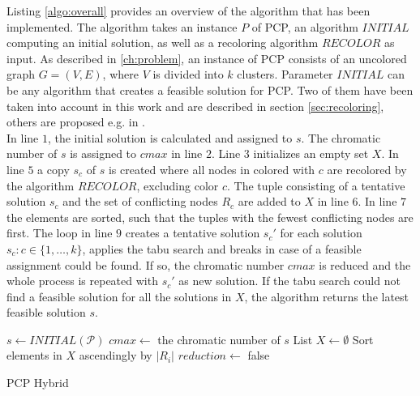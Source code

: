 Listing \ref{algo:overall} provides an overview of the algorithm that has been implemented. The algorithm takes an instance $P$ of PCP, an algorithm $\mathit{INITIAL}$ computing an initial solution, as well as a recoloring algorithm $\mathit{RECOLOR}$ as input. As described in \ref{ch:problem}, an instance of PCP consists of an uncolored graph $G=(V,E)$, where $V$ is divided into $k$ clusters. Parameter $\mathit{INITIAL}$ can be any algorithm that creates a feasible solution for PCP. Two of them have been taken into account in this work and are described in section \ref{sec:recoloring}, others are proposed e.g. in \cite{li-00}.\\
In line $1$, the initial solution is calculated and assigned to $s$. The chromatic number of $s$ is assigned to $cmax$ in line $2$. Line $3$ initializes an empty set $X$. In line $5$ a copy $s_c$ of $s$ is created where all nodes in colored with $c$ are recolored by the algorithm $\mathit{RECOLOR}$, excluding color $c$. The tuple consisting of a tentative solution $s_c$ and the set of conflicting nodes $R_c$ are added to $X$ in line $6$. In line $7$ the elements are sorted, such that the tuples with the fewest conflicting nodes are first. The loop in line $9$ creates a tentative solution $s_c'$ for each solution $s_c : c\in \{1,\ldots ,k\}$, applies the tabu search and breaks in case of a feasible assignment could be found. If so, the chromatic number $cmax$ is reduced and the whole process is repeated with $s_c'$ as new solution. If the tabu search could not find a feasible solution for all the solutions in $X$, the algorithm returns the latest feasible solution $s$.
\begin{algorithm}[h]
$s \gets INITIAL(\mathcal{P})$\;
$cmax \gets$ the chromatic number of $s$\;
List $X \gets \emptyset $\;
Sort elements in $X$ ascendingly by $|R_i|$\;
$reduction \gets$ false\;
\;
\caption{PCP Hybrid}
\label{algo:overall}
\end{algorithm}
\clearpage



